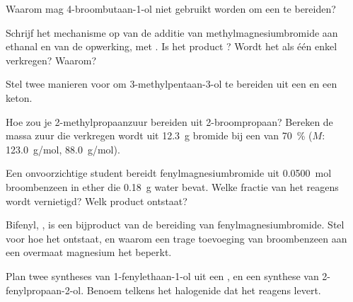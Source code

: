 \begin{exercise}[$\star$]\label{exo:b1:organomagnesium:4}
Waarom mag 4-broombutaan-1-ol niet gebruikt worden om een 
te bereiden?
\end{exercise}

\begin{exercise}[$\star\star$]\label{exo:b1:organomagnesium:5}
Schrijf het mechanisme op van de additie van methylmagnesiumbromide aan
ethanal en van de opwerking, met . Is het product ?
Wordt het als één enkel  verkregen? Waarom?
\end{exercise}

\begin{exercise}[$\star\star$]\label{exo:b1:organomagnesium:6}
Stel twee manieren voor om 3-methylpentaan-3-ol te bereiden uit een
 en een keton.
\end{exercise}

\begin{exercise}[$\star\star$]\label{exo:b1:organomagnesium:7}
Hoe zou je 2-methylpropaanzuur bereiden uit 2-broompropaan? Bereken de
massa zuur die verkregen wordt uit \qty{12.3}{g} bromide bij een
 van \qty{70}{\percent} ($M$:  \qty{123.0}{g/mol},
 \qty{88.0}{g/mol}).
\end{exercise}

\begin{exercise}[$\star\star$]\label{exo:b1:organomagnesium:8}
Een onvoorzichtige student bereidt fenylmagnesiumbromide uit
\qty{0.0500}{mol} broombenzeen in ether die \qty{0.18}{g} water bevat.
Welke fractie van het reagens wordt vernietigd? Welk product ontstaat?
\end{exercise}

\begin{exercise}[$\star\star$]\label{exo:b1:organomagnesium:9}
Bifenyl, , is een bijproduct van de bereiding van
fenylmagnesiumbromide. Stel voor hoe het ontstaat, en waarom een trage
toevoeging van broombenzeen aan een overmaat magnesium het beperkt.
\end{exercise}

\begin{exercise}[$\star\star\star$]\label{exo:b1:organomagnesium:10}
Plan twee syntheses van 1-fenylethaan-1-ol uit een , en
een synthese van 2-fenylpropaan-2-ol. Benoem telkens het halogenide dat
het reagens levert.
\end{exercise}

